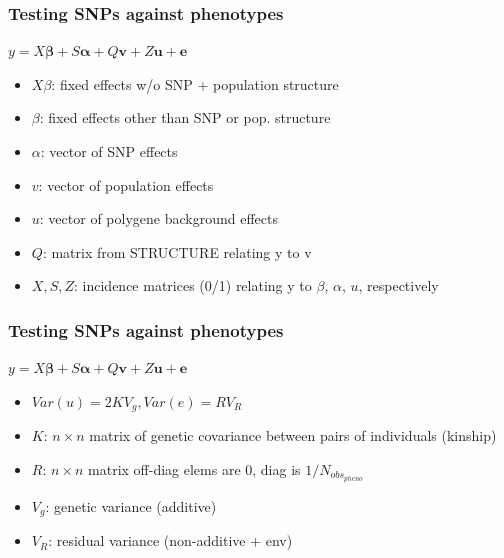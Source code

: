 \begin{frame}
\frametitle{Testing SNPs against phenotypes}
\begin{block}{}
\begin{center}
\Large{$y=X \bm{\beta} + S \bm{\alpha} + Q \bm{v} + Z \bm{u} + \bm{e}$}
\end{center}
\begin{itemize}
\item{$X \beta$: fixed effects w/o SNP + population structure}
\item{$\beta$: fixed effects other than SNP or pop. structure}
\item{$\alpha$: vector of SNP effects}
\item{$v$: vector of population effects}
\item{$u$: vector of polygene background effects}
\item{$Q$: matrix from STRUCTURE relating y to v}
\item{$X, S, Z$: incidence matrices (0/1) relating y to $\beta$, $\alpha$, $u$,
respectively}
\end{itemize}
\end{block}
\tiny
\citet{Yu:2006ij}
\end{frame}

\begin{frame}
\frametitle{Testing SNPs against phenotypes}
\begin{block}{}
\begin{center}
\Large{$y=X \bm{\beta} + S \bm{\alpha} + Q \bm{v} + Z \bm{u} + \bm{e}$}
\end{center}
\begin{itemize}
\item{$Var(u) = 2KV_g, Var(e) = RV_R$}
\item{$K$: $n \times n$ matrix of genetic covariance between pairs of
individuals (kinship)}
\item{$R$: $n \times n$ matrix off-diag elems are 0, diag is
$1/N_{{obs}_{pheno}}$}
\item{$V_g$: genetic variance (additive)}
\item{$V_R$: residual variance (non-additive + env)}
\end{itemize}
\end{block}
\tiny
\citet{Yu:2006ij}
\end{frame}

